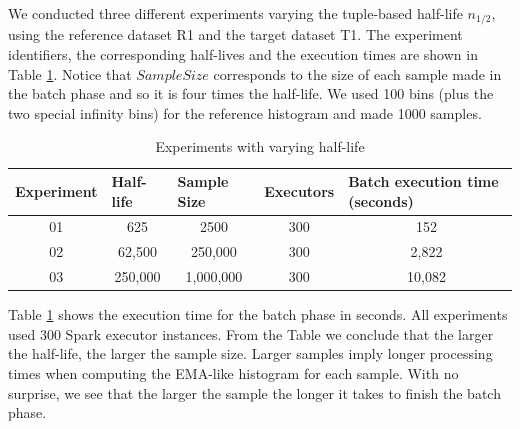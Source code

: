 We conducted three different experiments varying the tuple-based half-life $n_{1/2}$, using the reference dataset R1 and the target dataset T1. The experiment identifiers, the corresponding half-lives and the execution times are shown in Table \ref{tbl:tests-half-life}. Notice that $Sample Size$ corresponds to the size of each sample made in the batch phase and so it is four times the half-life. We used 100 bins (plus the two special infinity bins) for the reference histogram and made 1000 samples.
\begin{table}[!htb]
    \begin{center}
        \begin{tabular}{|c|c|c|c|c|}
        \hline
        \multicolumn{1}{|l|}{\textbf{Experiment}} & \multicolumn{1}{l|}{\textbf{Half-life}} & \multicolumn{1}{l|}{\textbf{Sample Size}} & \multicolumn{1}{l|}{\textbf{Executors}} & \multicolumn{1}{l|}{\textbf{Batch execution time (seconds)}} \\ \hline
        01                                        & 625                                     & 2500                                      & 300                                     & 152                                                          \\ \hline
        02                                        & 62,500                                  & 250,000                                   & 300                                     & 2,822                                                        \\ \hline
        03                                        & 250,000                                 & 1,000,000                                 & 300                                     & 10,082                                                       \\ \hline
        \end{tabular}
    \end{center}
    \caption{Experiments with varying half-life}
    \label{tbl:tests-half-life}
\end{table}
Table \ref{tbl:tests-half-life} shows the execution time for the batch phase in seconds. All experiments used 300 Spark executor instances. From the Table we conclude that the larger the half-life, the larger the sample size. Larger samples imply longer processing times when computing the EMA-like histogram for each sample. With no surprise, we see that the larger the sample the longer it takes to finish the batch phase.


